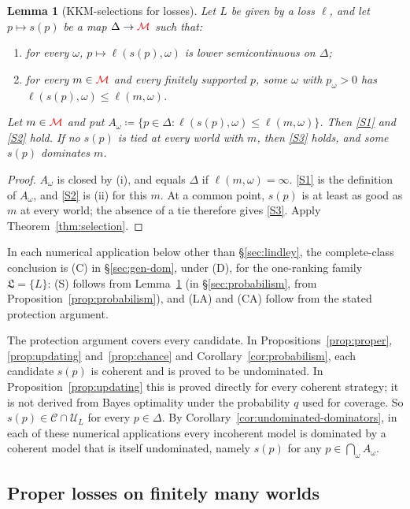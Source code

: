 \documentclass[11pt]{article}
\newcommand{\chg}[1]{{\color{red}#1}}
\newcommand{\chgb}[1]{{\color{red}#1}}
\newtheorem{lemma}[theorem]{Lemma}
\theoremstyle{definition}
\theoremstyle{remark}
\newcommand{\M}{\mathcal M}
\newcommand{\C}{\mathcal C}
\newcommand{\U}{\mathcal U}
\newcommand{\Lf}{\mathfrak L}
\begin{document}
\begin{lemma}[KKM-selections for losses]\label{lem:loss-one-stage}
Let $L$ be given by a loss $\ell$, and let $p\mapsto s(p)$ be a map $\Delta\to\chg{\M}$ such that:
\begin{enumerate}[label=(\roman*)]
\item for every $\omega$, $p\mapsto\ell(s(p),\omega)$ is lower semicontinuous on $\Delta$;
\item for every $m\in\chg{\M}$ and every finitely supported $p$, some $\omega$ with $p_\omega>0$ has $\ell(s(p),\omega)\le\ell(m,\omega)$.
\end{enumerate}
Let $m\in\chg{\M}$ and put $A_\omega\coloneqq\{p\in\Delta:\ell(s(p),\omega)\le\ell(m,\omega)\}$. Then \ref{S1} and \ref{S2} hold. If no $s(p)$ is tied at every world with $m$, then \ref{S3} holds, and some $s(p)$ dominates $m$.
\end{lemma}
\begin{proof}
$A_\omega$ is closed by (i), and equals $\Delta$ if $\ell(m,\omega)=\infty$. \ref{S1} is the definition of $A_\omega$, and \ref{S2} is (ii) for this $m$. \chg{At a common point, $s(p)$ is at least as good as $m$ at every world; the absence of a tie therefore gives \ref{S3}.} Apply Theorem~\ref{thm:selection}.
\end{proof}

\chg{In each numerical application below other than \S\ref{sec:lindley}, the complete-class conclusion is (C) in \S\ref{sec:gen-dom}, under (D), for the one-ranking family $\Lf=\{L\}$: (S) follows from Lemma~\ref{lem:loss-one-stage}\chgb{ (in \S\ref{sec:probabilism}, from Proposition~\ref{prop:probabilism})}, and (LA) and (CA) follow from the stated protection argument.}

The protection argument covers every candidate. In Propositions~\ref{prop:proper}, \ref{prop:updating} and~\ref{prop:chance}\chgb{ and Corollary~\ref{cor:probabilism}}, each candidate $s(p)$ is coherent and is proved to be undominated. In Proposition~\ref{prop:updating} this is proved directly for every coherent strategy; it is not derived from Bayes optimality under the probability $q$ used for coverage. So $s(p)\in\C\cap\U_L$ for every $p\in\Delta$. By Corollary~\ref{cor:undominated-dominators}, in each of these numerical applications every incoherent model is dominated by a coherent model that is itself undominated, namely $s(p)$ for any $p\in\bigcap_\omega A_\omega$.

\subsection{Proper losses on finitely many worlds}
\end{document}
